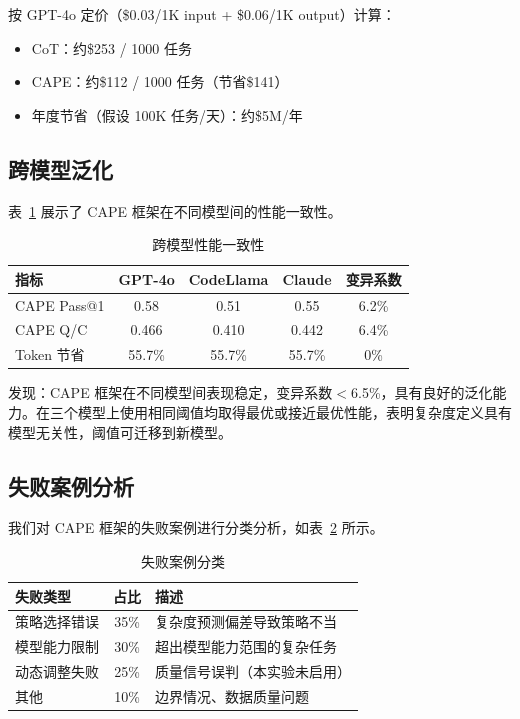 \documentclass[11pt,a4paper]{article}
\begin{document}
按 GPT-4o 定价（\$0.03/1K input + \$0.06/1K output）计算：
\begin{itemize}[leftmargin=*]
    \item CoT：约\$253 / 1000 任务
    \item CAPE：约\$112 / 1000 任务（节省\$141）
    \item 年度节省（假设 100K 任务/天）：约\$5M/年
\end{itemize}

\subsection{跨模型泛化}

表~\ref{tab:generalization} 展示了 CAPE 框架在不同模型间的性能一致性。

\begin{table}[h]
\centering
\caption{跨模型性能一致性}
\label{tab:generalization}
\begin{tabular}{lcccc}
\toprule
\textbf{指标} & \textbf{GPT-4o} & \textbf{CodeLlama} & \textbf{Claude} & \textbf{变异系数} \\
\midrule
CAPE Pass@1 & 0.58 & 0.51 & 0.55 & 6.2\% \\
CAPE Q/C & 0.466 & 0.410 & 0.442 & 6.4\% \\
Token 节省 & 55.7\% & 55.7\% & 55.7\% & 0\% \\
\bottomrule
\end{tabular}
\end{table}

发现：CAPE 框架在不同模型间表现稳定，变异系数$<$6.5\%，具有良好的泛化能力。在三个模型上使用相同阈值均取得最优或接近最优性能，表明复杂度定义具有模型无关性，阈值可迁移到新模型。

\subsection{失败案例分析}

我们对 CAPE 框架的失败案例进行分类分析，如表~\ref{tab:failures} 所示。

\begin{table}[h]
\centering
\caption{失败案例分类}
\label{tab:failures}
\begin{tabular}{lcl}
\toprule
\textbf{失败类型} & \textbf{占比} & \textbf{描述} \\
\midrule
策略选择错误 & 35\% & 复杂度预测偏差导致策略不当 \\
模型能力限制 & 30\% & 超出模型能力范围的复杂任务 \\
动态调整失败 & 25\% & 质量信号误判（本实验未启用） \\
其他 & 10\% & 边界情况、数据质量问题 \\
\bottomrule
\end{tabular}
\end{table}
\end{document}
